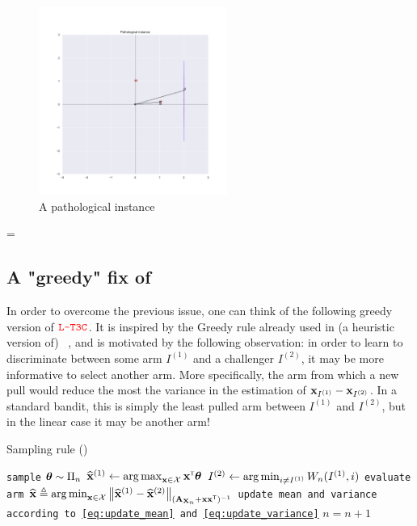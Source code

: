 \begin{figure}[ht]
    \centering
    \includegraphics[width=0.55\textwidth]{Chapter4/img/instance.pdf}
    \caption{A pathological instance}
    \label{fig:instance}
\end{figure}
 =
\subsection{A "greedy" fix of \LTCC{}}

In order to overcome the previous issue, one can think of the following greedy version of $\textcolor{red}{\texttt{L-T3C}}$. It is inspired by the Greedy rule already used in (a heuristic version of) \LGapE~\citep{xu2018linear}, and is motivated by the following observation: in order to learn to discriminate between some arm $I^{(1)}$ and a challenger $I^{(2)}$, it may be more informative to select another arm. More specifically, the arm from which a new pull would reduce the most the variance in the estimation of ${\bf x}_{I^{(1)}} - {\bf x}_{I^{(2)}}$. In a standard bandit, this is simply the least pulled arm between $I^{(1)}$ and $I^{(2)}$, but in the linear case it may be another arm! 

\begin{algorithm}[ht]
\centering
\caption{Sampling rule (\LTCCG)}
\label{alg:lt3cg}
\begin{algorithmic}[1]
        \State \texttt{sample} ${\boldsymbol \theta} \sim \Pi_n$
        \State $\widehat{{\bf x}}^{(1)} \leftarrow \operatorname*{arg\,max}_{{\bf x}\in\mathcal{X}} {\bf x}^\mathsf{\scriptscriptstyle T}{\boldsymbol \theta}$ 
	        \State $I^{(2)} \leftarrow \operatorname*{arg\,min}_{i\neq I^{(1)}}W_n(I^{(1)},i)$ 
		    \State \texttt{evaluate arm} $\widehat{{\bf x}} \triangleq \operatorname*{arg\,min}_{{\bf x}\in\mathcal{X}} \left\lVert\widehat{{\bf x}}^{(1)} - \widehat{{\bf x}}^{(2)}\right\rVert_{({\bf A}_{{\bf X}_n}+{\bf x}{\bf x}^\mathsf{\scriptscriptstyle T})^{-1}}$
	    \State \texttt{update mean and variance according to \eqref{eq:update_mean} and \eqref{eq:update_variance}}
	    \State $n = n+1$
   \EndFor
\end{algorithmic}
\end{algorithm}

